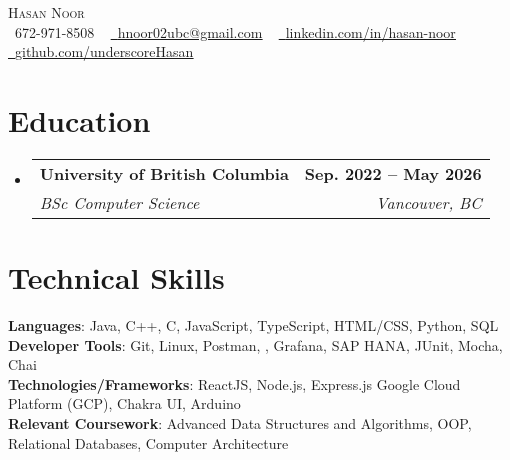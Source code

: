 \documentclass[letterpaper,11pt]{article}
\makeatletter
\newcommand{\resumeSubheading}[4]{
  \vspace{-2pt}\item
    \begin{tabular*}{1.0\textwidth}[t]{l@{\extracolsep{\fill}}r}
      \textbf{#1} & \textbf{\small #2} \\
      \textit{\small#3} & \textit{\small #4} \\
    \end{tabular*}\vspace{-7pt}
}
\newcommand{\resumeSubHeadingListStart}{\begin{itemize}[leftmargin=0.0in, label={}]}
\newcommand{\resumeSubHeadingListEnd}{\end{itemize}}
\makeatother
\begin{document}

\begin{center}
    {\Huge \scshape Hasan Noor} \\ \vspace{1pt}
    \small \raisebox{-0.1\height}\faPhone\ 672-971-8508 ~ \href{mailto:hnoor02ubc@gmail.com}{\raisebox{-0.2\height}\faEnvelope\  \underline{hnoor02ubc@gmail.com}} ~ 
    \href{https://linkedin.com/in/hasan-noor/}{\raisebox{-0.2\height}\faLinkedin\ \underline{linkedin.com/in/hasan-noor}}  ~
    \href{https://github.com/underscoreHasan}{\raisebox{-0.2\height}\faGithub\ \underline{github.com/underscoreHasan}}
    \vspace{-8pt}
\end{center}


\section{Education}
  \resumeSubHeadingListStart
    \resumeSubheading
      {University of British Columbia}{Sep. 2022 -- May 2026}
      {BSc Computer Science}{Vancouver, BC}
  \resumeSubHeadingListEnd

%
\section{Technical Skills}
 \begin{itemize}[leftmargin=0.15in, label={}]
    \small{\item{
     \textbf{Languages}{: Java, C++, C, JavaScript, TypeScript, HTML/CSS, Python, SQL} \\
     \textbf{Developer Tools}{: Git, Linux, Postman, , Grafana, SAP HANA, JUnit, Mocha, Chai} \\
     \textbf{Technologies/Frameworks}{: ReactJS, Node.js, Express.js Google Cloud Platform (GCP), Chakra UI, Arduino
} \\
     \textbf{Relevant Coursework}{: Advanced Data Structures and Algorithms, OOP, Relational Databases, Computer Architecture} \\
    }}
 \end{itemize}
 \vspace{-16pt}
\end{document}
